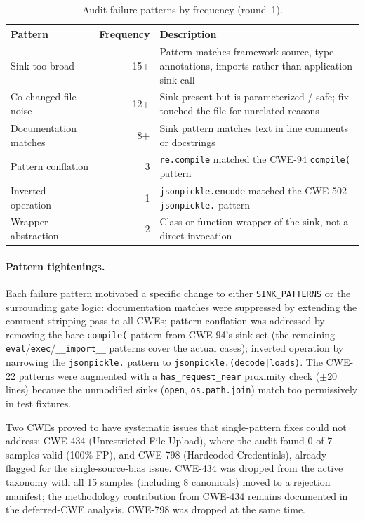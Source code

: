 \begin{table}[h]
\centering
\caption{Audit failure patterns by frequency (round~1).}
\label{tab:audit-patterns}
\begin{tabular}{p{5cm}rp{6cm}}
\toprule
\textbf{Pattern} & \textbf{Frequency} & \textbf{Description} \\
\midrule
Sink-too-broad & 15+ & Pattern matches framework source, type annotations, imports rather than application sink call \\
Co-changed file noise & 12+ & Sink present but is parameterized / safe; fix touched the file for unrelated reasons \\
Documentation matches & 8+ & Sink pattern matches text in line comments or docstrings \\
Pattern conflation & 3 & \texttt{re.compile} matched the CWE-94 \texttt{compile(} pattern \\
Inverted operation & 1 & \texttt{jsonpickle.encode} matched the CWE-502 \texttt{jsonpickle.} pattern \\
Wrapper abstraction & 2 & Class or function wrapper of the sink, not a direct invocation \\
\bottomrule
\end{tabular}
\end{table}

\paragraph{Pattern tightenings.}
Each failure pattern motivated a specific change to either
\texttt{SINK\_PATTERNS} or the surrounding gate logic:
documentation matches were suppressed by extending the
comment-stripping pass to all CWEs; pattern conflation was
addressed by removing the bare \texttt{compile(} pattern from
CWE-94's sink set (the remaining
\texttt{eval}/\texttt{exec}/\texttt{\_\_import\_\_} patterns cover
the actual cases); inverted operation by narrowing the
\texttt{jsonpickle.} pattern to \texttt{jsonpickle.(decode|loads)}.
The CWE-22 patterns were augmented with a
\texttt{has\_request\_near} proximity check ($\pm 20$ lines)
because the unmodified sinks (\texttt{open}, \texttt{os.path.join})
match too permissively in test fixtures.

Two CWEs proved to have systematic issues that single-pattern
fixes could not address: CWE-434 (Unrestricted File Upload), where
the audit found 0 of 7 samples valid (100\% FP), and CWE-798
(Hardcoded Credentials), already flagged for the single-source-bias
issue. CWE-434 was dropped from the active taxonomy with all 15
samples (including 8 canonicals) moved to a rejection manifest; the
methodology contribution from CWE-434 remains documented in the
deferred-CWE analysis. CWE-798 was dropped at the same time.

